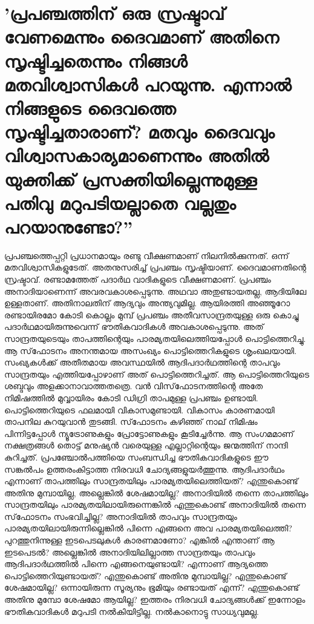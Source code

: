  \section{ 'പ്രപഞ്ചത്തിന് ഒരു സ്രഷ്ടാവ് വേണമെന്നും ദൈവമാണ് അതിനെ സൃഷ്ടിച്ചതെന്നും നിങ്ങള്‍ മതവിശ്വാസികള്‍ പറയുന്നു. എന്നാല്‍ നിങ്ങളുടെ ദൈവത്തെ സൃഷ്ടിച്ചതാരാണ്? മതവും ദൈവവും വിശ്വാസകാര്യമാണെന്നും അതില്‍ യുക്തിക്ക് പ്രസക്തിയില്ലെന്നുമുള്ള പതിവു മറുപടിയല്ലാതെ വല്ലതും പറയാനുണ്ടോ?''}
 പ്രപഞ്ചത്തെപ്പറ്റി പ്രധാനമായും രണ്ടു വീക്ഷണമാണ് നിലനില്‍ക്കുന്നത്. ഒന്ന് മതവിശ്വാസികളുടേത്. അതനുസരിച്ച് പ്രപഞ്ചം സൃഷ്ടിയാണ്. ദൈവമാണതിന്റെ സ്രഷ്ടാവ്. രണ്ടാമത്തേത് പദാര്‍ഥ വാദികളുടെ വീക്ഷണമാണ്. പ്രപഞ്ചം അനാദിയാണെന്ന് അവരവകാശപ്പെടുന്നു. അഥവാ അതുണ്ടായതല്ല, ആദിയിലേ ഉള്ളതാണ്. അതിനാലതിന് ആദ്യവും അന്ത്യവുമില്ല.
ആയിരത്തി അഞ്ഞൂറോ രണ്ടായിരമോ കോടി കൊല്ലം മുമ്പ് പ്രപഞ്ചം അതീവസാന്ദ്രതയുള്ള ഒരു കൊച്ചു പദാര്‍ഥമായിരുന്നുവെന്ന് ഭൗതികവാദികള്‍ അവകാശപ്പെടുന്നു. അത് സാന്ദ്രതയുടെയും താപത്തിന്റെയും പാരമ്യതയിലെത്തിയപ്പോള്‍ പൊട്ടിത്തെറിച്ചു. ആ സ്‌ഫോടനം അനന്തമായ അസംഖ്യം പൊട്ടിത്തെറികളുടെ ശൃംഖലയായി. സംഖ്യകള്‍ക്ക് അതീതമായ അവസ്ഥയില്‍ ആദിപദാര്‍ഥത്തിന്റെ താപവും സാന്ദ്രതയും എത്തിയപ്പോഴാണ് അത് പൊട്ടിത്തെറിച്ചത്. ആ പൊട്ടിത്തെറിയുടെ ശബ്ദവും അളക്കാനാവാത്തതത്രെ. വന്‍ വിസ്‌ഫോടനത്തിന്റെ അതേ നിമിഷത്തില്‍ മുവ്വായിരം കോടി ഡിഗ്രി താപമുള്ള പ്രപഞ്ചം ഉണ്ടായി. പൊട്ടിത്തെറിയുടെ ഫലമായി വികാസമുണ്ടായി. വികാസം കാരണമായി താപനില കുറയുവാന്‍ തുടങ്ങി. സ്‌ഫോടനം കഴിഞ്ഞ് നാല് നിമിഷം പിന്നിട്ടപ്പോള്‍ ന്യൂട്രോണുകളും പ്രോട്ടോണുകളും കൂടിച്ചേര്‍ന്നു. ആ സംഗമമാണ് നക്ഷത്രങ്ങള്‍ തൊട്ട് മനുഷ്യന്‍ വരെയുള്ള എല്ലാറ്റിന്റെയും ജന്മത്തിന് നാന്ദി കുറിച്ചത്.
പ്രപഞ്ചോല്‍പത്തിയെ സംബന്ധിച്ച ഭൗതികവാദികളുടെ ഈ സങ്കല്‍പം ഉത്തരംകിട്ടാത്ത നിരവധി ചോദ്യങ്ങളുയര്‍ത്തുന്നു. ആദിപദാര്‍ഥം എന്നാണ് താപത്തിലും സാന്ദ്രതയിലും പാരമ്യതയിലെത്തിയത്? എന്തുകൊണ്ട് അതിനു മുമ്പായില്ല, അല്ലെങ്കില്‍ ശേഷമായില്ല? അനാദിയില്‍ തന്നെ താപത്തിലും സാന്ദ്രതയിലും പാരമ്യതയിലായിരുന്നെങ്കില്‍ എന്തുകൊണ്ട് അനാദിയില്‍ തന്നെ സ്‌ഫോടനം സംഭവിച്ചില്ല? അനാദിയില്‍ താപവും സാന്ദ്രതയും പാരമ്യതയിലായിരുന്നില്ലെങ്കില്‍ പിന്നെ എങ്ങനെ അവ പാരമ്യതയിലെത്തി? പുറത്തുനിന്നുള്ള ഇടപെടലുകള്‍ കാരണമാണോ? എങ്കില്‍ എന്താണ് ആ ഇടപെടല്‍? അല്ലെങ്കില്‍ അനാദിയിലില്ലാത്ത സാന്ദ്രതയും താപവും ആദിപദാര്‍ഥത്തില്‍ പിന്നെ എങ്ങനെയുണ്ടായി? എന്നാണ് ആദ്യത്തെ പൊട്ടിത്തെറിയുണ്ടായത്? എന്തുകൊണ്ട് അതിനു മുമ്പായില്ല? എന്തുകൊണ്ട് ശേഷമായില്ല? ഒന്നായിരുന്ന സൂര്യനും ഭൂമിയും രണ്ടായത് എന്ന്? എന്തുകൊണ്ട് അതിനു മുമ്പോ ശേഷമോ ആയില്ല? ഇത്തരം നിരവധി ചോദ്യങ്ങള്‍ക്ക് ഇന്നോളം ഭൗതികവാദികള്‍ മറുപടി നല്‍കിയിട്ടില്ല. നല്‍കാനൊട്ടു സാധ്യവുമല്ല.
